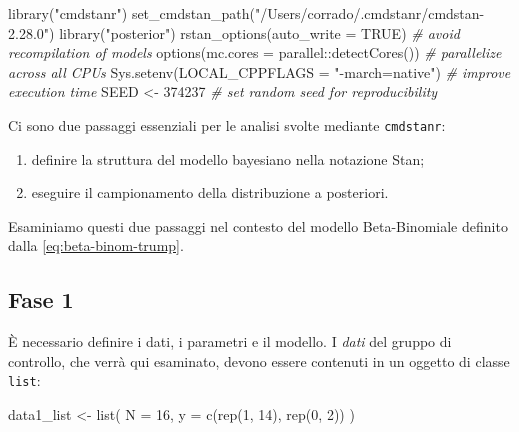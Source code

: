 \documentclass[
]{memoir}
\newenvironment{Shaded}{\begin{snugshade}}{\end{snugshade}}
\newcommand{\AttributeTok}[1]{\textcolor[rgb]{0.77,0.63,0.00}{#1}}
\newcommand{\CommentTok}[1]{\textcolor[rgb]{0.56,0.35,0.01}{\textit{#1}}}
\newcommand{\ConstantTok}[1]{\textcolor[rgb]{0.00,0.00,0.00}{#1}}
\newcommand{\DecValTok}[1]{\textcolor[rgb]{0.00,0.00,0.81}{#1}}
\newcommand{\FunctionTok}[1]{\textcolor[rgb]{0.00,0.00,0.00}{#1}}
\newcommand{\NormalTok}[1]{#1}
\newcommand{\OtherTok}[1]{\textcolor[rgb]{0.56,0.35,0.01}{#1}}
\newcommand{\SpecialCharTok}[1]{\textcolor[rgb]{0.00,0.00,0.00}{#1}}
\newcommand{\StringTok}[1]{\textcolor[rgb]{0.31,0.60,0.02}{#1}}
\providecommand{\tightlist}{%
  \setlength{\itemsep}{0pt}\setlength{\parskip}{0pt}}
\begin{document}
\begin{Shaded}
\begin{Highlighting}[]
\FunctionTok{library}\NormalTok{(}\StringTok{"cmdstanr"}\NormalTok{)}
\FunctionTok{set\_cmdstan\_path}\NormalTok{(}\StringTok{"/Users/corrado/.cmdstanr/cmdstan{-}2.28.0"}\NormalTok{)}
\FunctionTok{library}\NormalTok{(}\StringTok{"posterior"}\NormalTok{)}
\FunctionTok{rstan\_options}\NormalTok{(}\AttributeTok{auto\_write =} \ConstantTok{TRUE}\NormalTok{) }\CommentTok{\# avoid recompilation of models}
\FunctionTok{options}\NormalTok{(}\AttributeTok{mc.cores =}\NormalTok{ parallel}\SpecialCharTok{::}\FunctionTok{detectCores}\NormalTok{()) }\CommentTok{\# parallelize across all CPUs}
\FunctionTok{Sys.setenv}\NormalTok{(}\AttributeTok{LOCAL\_CPPFLAGS =} \StringTok{"{-}march=native"}\NormalTok{) }\CommentTok{\# improve execution time}
\NormalTok{SEED }\OtherTok{\textless{}{-}} \DecValTok{374237} \CommentTok{\# set random seed for reproducibility}
\end{Highlighting}
\end{Shaded}

Ci sono due passaggi essenziali per le analisi svolte mediante \texttt{cmdstanr}:

\begin{enumerate}
\def\labelenumi{\arabic{enumi}.}
\tightlist
\item
  definire la struttura del modello bayesiano nella notazione Stan;
\item
  eseguire il campionamento della distribuzione a posteriori.
\end{enumerate}

Esaminiamo questi due passaggi nel contesto del modello Beta-Binomiale definito dalla \eqref{eq:beta-binom-trump}.

\hypertarget{fase-1}{%
\subsection{Fase 1}\label{fase-1}}

È necessario definire i dati, i parametri e il modello. I \emph{dati} del gruppo di controllo, che verrà qui esaminato, devono essere contenuti in un oggetto di classe \texttt{list}:

\begin{Shaded}
\begin{Highlighting}[]
\NormalTok{data1\_list }\OtherTok{\textless{}{-}} \FunctionTok{list}\NormalTok{(}
  \AttributeTok{N =} \DecValTok{16}\NormalTok{,}
  \AttributeTok{y =} \FunctionTok{c}\NormalTok{(}\FunctionTok{rep}\NormalTok{(}\DecValTok{1}\NormalTok{, }\DecValTok{14}\NormalTok{), }\FunctionTok{rep}\NormalTok{(}\DecValTok{0}\NormalTok{, }\DecValTok{2}\NormalTok{))}
\NormalTok{)}
\end{Highlighting}
\end{Shaded}
\end{document}

